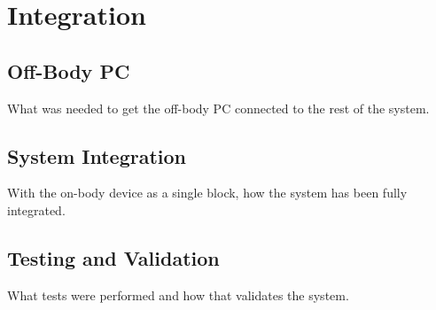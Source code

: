 \chapter{Integration}

\section{Off-Body PC}
What was needed to get the off-body PC connected to the rest of the system.

\section{System Integration}
With the on-body device as a single block, how the system has been fully integrated.

\section{Testing and Validation}
What tests were performed and how that validates the system.
